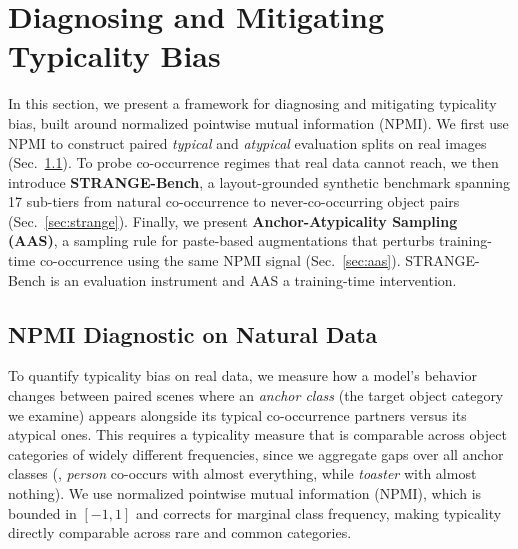 \section{Diagnosing and Mitigating Typicality Bias}

 In this section, we present a framework for diagnosing and mitigating typicality bias, built around normalized pointwise mutual information (NPMI). We first use NPMI to construct paired \emph{typical} and \emph{atypical} evaluation splits on real images (Sec.~\ref{sec:diagnostic}). To probe co-occurrence regimes that real data cannot reach, we then introduce \textbf{STRANGE-Bench}, a layout-grounded synthetic benchmark spanning 17 sub-tiers from natural co-occurrence to never-co-occurring object pairs (Sec.~\ref{sec:strange}). Finally, we present \textbf{Anchor-Atypicality Sampling (AAS)}, a sampling rule for paste-based augmentations that perturbs training-time co-occurrence using the same NPMI signal (Sec.~\ref{sec:aas}). STRANGE-Bench is an evaluation instrument and AAS a training-time intervention.

\subsection{NPMI Diagnostic on Natural Data}
\label{sec:diagnostic}

To quantify typicality bias on real data, we measure how a model's behavior changes between paired scenes where an \emph{anchor class} (the target object category we examine) appears alongside its typical co-occurrence partners versus its atypical ones. This requires a typicality measure that is comparable across object categories of widely different frequencies, since we aggregate gaps over all anchor classes (\eg, \emph{person} co-occurs with almost everything, while \emph{toaster} with almost nothing). We use normalized pointwise mutual information (NPMI), which is bounded in $[-1, 1]$ and corrects for marginal class frequency, making typicality directly comparable across rare and common categories.

